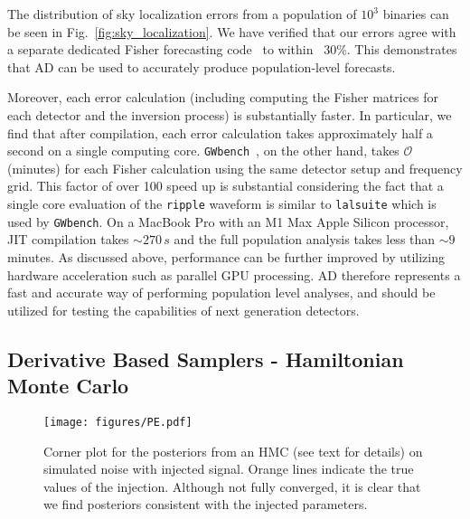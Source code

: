 \documentclass[twocolumn]{aastex631}
\newcommand{\ripple}{\texttt{ripple}\xspace}
\newcommand{\lalsuite}{\texttt{lalsuite}\xspace}
\newcommand{\kw}[1]{{\color{rb4}[KW: #1 ]}}
\newcommand{\amc}[1]{{\color{red}[AC: #1]}}
\begin{document}
The distribution of sky localization errors from a population of $10^3$ binaries can be seen in Fig.~\ref{fig:sky_localization}.
We have verified that our errors agree with a separate dedicated Fisher forecasting code~\citep{Borhanian:2020ypi} to within ~30\%.
This demonstrates that AD can be used to accurately produce population-level forecasts.

Moreover, each error calculation (including computing the Fisher matrices for each detector and the inversion process) is substantially faster.
In particular, we find that after compilation, each error calculation takes approximately half a second on a single computing core.
\texttt{GWbench}~\citep{Borhanian:2020ypi}, on the other hand, takes $\mathcal{O}$(minutes) for each Fisher calculation using the same detector setup and frequency grid.
This factor of over 100 speed up is substantial considering the fact that a single core evaluation of the \ripple waveform is similar to \lalsuite which is used by \texttt{GWbench}.
On a MacBook Pro with an M1 Max Apple Silicon processor, JIT compilation takes $\sim 270\,s$ and the full population analysis takes less than $\sim 9$ minutes.
As discussed above, performance can be further improved by utilizing hardware acceleration such as parallel GPU processing.
AD therefore represents a fast and accurate way of performing population level analyses, and should be utilized for testing the capabilities of next generation detectors.

\subsection{Derivative Based Samplers - Hamiltonian Monte Carlo}
\label{subsec:hmc}

\begin{figure*}[t]
    \centering
    \texttt{[image: figures/PE.pdf]}
    \caption{
        Corner plot for the posteriors from an HMC (see text for details) on simulated noise with injected signal. 
        Orange lines indicate the true values of the injection. 
        Although not fully converged, it is clear that we find posteriors consistent with the injected parameters. 
    }
    \label{fig:corner}
\end{figure*}
\end{document}
